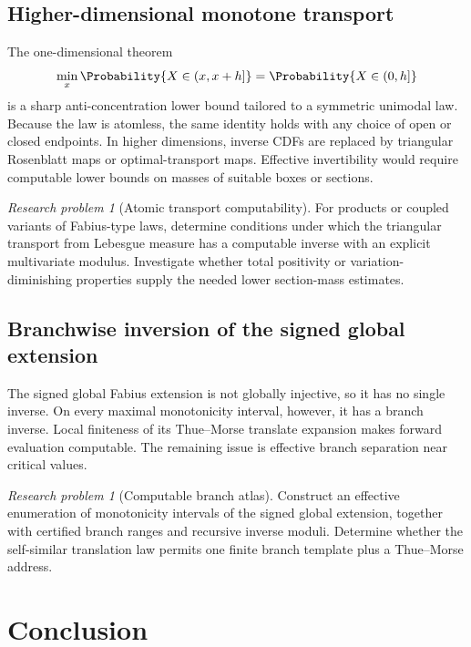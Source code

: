 \documentclass[11pt,oneside]{article}
\theoremstyle{definition}
\theoremstyle{remark}
\numberwithin{equation}{section}
\newtheorem{problem}[theorem]{Research problem}
\begin{document}
\subsection{Higher-dimensional monotone transport}

The one-dimensional theorem
\[
 \min_x \Probability\{X\in(x,x+h]\}=\Probability\{X\in(0,h]\}
\]
is a sharp anti-concentration lower bound tailored to a symmetric unimodal
law.  Because the law is atomless, the same identity holds with any choice of
open or closed endpoints.  In higher dimensions, inverse CDFs are replaced by
triangular Rosenblatt maps or optimal-transport maps.  Effective invertibility
would require computable lower bounds on masses of suitable boxes or sections.

\begin{problem}[Atomic transport computability]
For products or coupled variants of Fabius-type laws, determine conditions
under which the triangular transport from Lebesgue measure has a computable
inverse with an explicit multivariate modulus.  Investigate whether total
positivity or variation-diminishing properties supply the needed lower
section-mass estimates.
\end{problem}

\subsection{Branchwise inversion of the signed global extension}

The signed global Fabius extension is not globally injective, so it has no
single inverse.  On every maximal monotonicity interval, however, it has a
branch inverse.  Local finiteness of its Thue--Morse translate expansion makes
forward evaluation computable.  The remaining issue is effective branch
separation near critical values.

\begin{problem}[Computable branch atlas]
Construct an effective enumeration of monotonicity intervals of the signed
global extension, together with certified branch ranges and recursive inverse
moduli.  Determine whether the self-similar translation law permits one finite
branch template plus a Thue--Morse address.
\end{problem}

\section{Conclusion}
\label{sec:conclusion}
\end{document}
